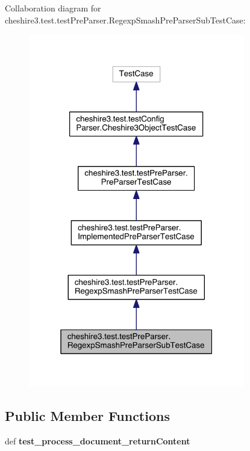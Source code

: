 Collaboration diagram for cheshire3.\-test.\-test\-Pre\-Parser.\-Regexp\-Smash\-Pre\-Parser\-Sub\-Test\-Case\-:
\nopagebreak
\begin{figure}[H]
\begin{center}
\leavevmode
\includegraphics[width=268pt]{classcheshire3_1_1test_1_1test_pre_parser_1_1_regexp_smash_pre_parser_sub_test_case__coll__graph}
\end{center}
\end{figure}
\subsection*{Public Member Functions}
\begin{DoxyCompactItemize}
\item 
\hypertarget{classcheshire3_1_1test_1_1test_pre_parser_1_1_regexp_smash_pre_parser_sub_test_case_acf27fef06eced1e5bcd9a6f03ba61db5}{def {\bfseries test\-\_\-process\-\_\-document\-\_\-return\-Content}}\label{classcheshire3_1_1test_1_1test_pre_parser_1_1_regexp_smash_pre_parser_sub_test_case_acf27fef06eced1e5bcd9a6f03ba61db5}

\end{DoxyCompactItemize}
